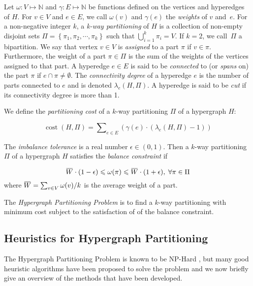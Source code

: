 \documentclass[twocolumn]{svjour3}          \smartqed
\newcommand{\overbar}[1]{\mkern 1.5mu\overline{\mkern-1.5mu#1\mkern-1.5mu}\mkern 1.5mu}
\begin{document}
Let $\omega \colon V \mapsto \mathbb{N}$ and $\gamma \colon E \mapsto \mathbb{N}$ be functions defined on the vertices and hyperedges of $H$.  For $v \in V$ and $e \in E$, we call $\omega(v)$ and $\gamma(e)$ the \textit{weights} of $v$ and~$e$.   For a non-negative integer $k$, a \textit{k-way partitioning} of $H$ is a collection of non-empty disjoint sets $\Pi = \left\lbrace \pi_1, \pi_2, \cdots, \pi_k \right\rbrace$  such that $\bigcup_{i=1}^{k} \pi_i=V$.   If $k=2$, we call~$\Pi$ a bipartition.  We say that vertex $v \in V$ is \emph{assigned} to a part $\pi$ if $v \in \pi$. Furthermore, the weight of a part $\pi \in \Pi$ is the sum of the weights of the vertices assigned to that part. A hyperedge $e \in E$ is said to be \textit{connected} to (or \textit{spans} on) the part $\pi$ if $e \cap \pi \neq \emptyset$. The \textit{connectivity degree} of a hyperedge $e$ is the number of parts connected to $e$ and is denoted $\lambda_e(H,\Pi)$. A hyperedge is said to be \textit{cut} if its connectivity degree is more than 1.

We define the \textit{partitioning cost} of a $k$-way partitioning $\Pi$ of a hypergraph $H$:

\begin{equation} \label{eq:costfunction}
\operatorname{cost}(H,\Pi)=\sum\nolimits_{e \in E} (\gamma(e) \cdot  (\lambda_{e} (H,\Pi)-1))
\end{equation}

The \emph{imbalance tolerance} is a real number $\epsilon \in (0,1)$.   Then a $k$-way partitioning $\Pi$ of a hypergraph $H$ satisfies the \textit{balance constraint} if

\begin{equation}\label{eq:imbalance}
\overbar{W} \cdot (1 - \epsilon) \leqslant \omega(\pi) \leqslant \overbar{W} \cdot (1 + \epsilon), \; \forall \pi \in \Pi
\end{equation}
where $\overbar{W} =\sum\nolimits_{v \in V} \omega(v)/k$ is the average weight of a part.

The \textit{Hypergraph Partitioning Problem} is to find a $k$-way partitioning with minimum cost subject to the satisfaction of of the balance constraint.


\subsection{Heuristics for Hypergraph Partitioning}\label{sec:relatedwork}

The Hypergraph Partitioning Problem is known to be NP-Hard \cite{garey1979computers}, but many good heuristic algorithms have been proposed to solve the problem \cite{ccatalyurek2011patoh,devetal2006,fm1982,karypis1999kway} and we now briefly give an overview of the methods that have been developed.
\end{document}
